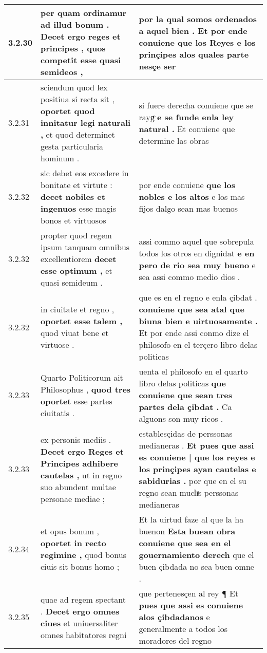 \begin{tabular}{|p{1cm}|p{6.5cm}|p{6.5cm}|}
3.2.30 & per quam ordinamur ad illud bonum . \textbf{ Decet ergo reges et principes , } quos competit esse quasi semideos , & por la qual somos ordenados a aquel bien . \textbf{ Et por ende conuiene que los Reyes e los prinçipes } alos quales parte nesçe ser \\\hline
3.2.31 & sciendum quod lex positiua si recta sit , \textbf{ oportet quod innitatur legi naturali , } et quod determinet gesta particularia hominum . & si fuere derecha conuiene que se raygͤ \textbf{ e se funde enla ley natural . } Et conuiene que determine las obras \\\hline
3.2.32 & sic debet eos excedere in bonitate et virtute : \textbf{ decet nobiles et ingenuos } esse magis bonos et virtuosos & por ende conuiene \textbf{ que los nobles e los altos } e los mas fijos dalgo sean mas buenos \\\hline
3.2.32 & propter quod regem ipsum tanquam omnibus excellentiorem \textbf{ decet esse optimum , } et quasi semideum . & assi commo aquel que sobrepula todos los otros en dignidat \textbf{ e en pero de rio sea muy bueno } e sea assi commo medio dios . \\\hline
3.2.32 & in ciuitate et regno , \textbf{ oportet esse talem , } quod viuat bene et virtuose . & que es en el regno e enla çibdat . \textbf{ conuiene que sea atal que biuna bien e uirtuosamente . } Et por ende assi conmo dize el philosofo en el terçero libro delas politicas \\\hline
3.2.33 & Quarto Politicorum ait Philosophus , \textbf{ quod tres oportet } esse partes ciuitatis . & uenta el philosofo en el quarto libro delas politicas \textbf{ que conuiene que sean tres partes dela çibdat . } Ca alguons son muy ricos . \\\hline
3.2.33 & ex personis mediis . \textbf{ Decet ergo Reges et Principes adhibere cautelas , } ut in regno suo abundent multae personae mediae ; & establesçidas de perssonas medianeras . \textbf{ Et pues que assi es conuiene | que los reyes e los prinçipes ayan cautelas e sabidurias . } por que en el su regno sean muchͣs perssonas medianeras \\\hline
3.2.34 & et opus bonum , \textbf{ oportet in recto regimine , } quod bonus ciuis sit bonus homo ; & Et la uirtud faze al que la ha buenon \textbf{ Esta buean obra conuiene que sea en el gouernamiento derech } que el buen çibdada no sea buen omne . \\\hline
3.2.35 & quae ad regem spectant . \textbf{ Decet ergo omnes ciues } et uniuersaliter omnes habitatores regni & que pertenesçen al rey ¶ Et \textbf{ pues que assi es conuiene alos çibdadanos } e generalmente a todos los moradores del regno \\\hline

\end{tabular}
